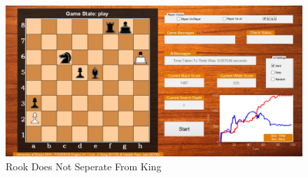 \documentclass[11pt,a4paper]{article}
\begin{document}
\begin{figure}[H]
\centering
\includegraphics[width=1\textwidth]{HeuristicProblem}
\caption{Rook Does Not Seperate From King}
\label{fig:chess1}
\end{figure}
\end{document}
